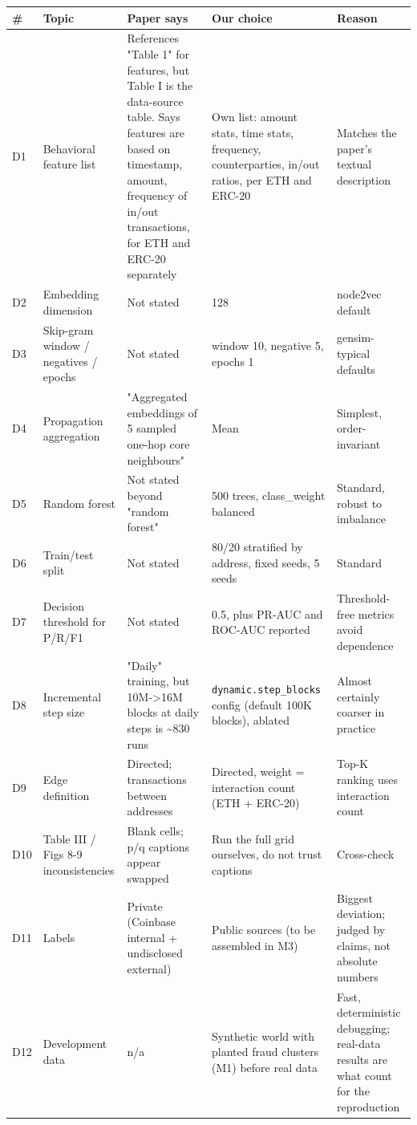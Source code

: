 \begin{longtable}{p{0.7cm} p{2.1cm} p{3.2cm} p{4.2cm} p{3.6cm}}
\toprule
\# & Topic & Paper says & Our choice & Reason\\
\midrule
\endhead
D1 & Behavioral feature list & References "Table 1" for features, but Table I is the data-source table. Says features are based on timestamp, amount, frequency of in/out transactions, for ETH and ERC-20 separately & Own list: amount stats, time stats, frequency, counterparties, in/out ratios, per ETH and ERC-20 & Matches the paper's textual description\\[2pt]
D2 & Embedding dimension & Not stated & 128 & node2vec default\\[2pt]
D3 & Skip-gram window / negatives / epochs & Not stated & window 10, negative 5, epochs 1 & gensim-typical defaults\\[2pt]
D4 & Propagation aggregation & "Aggregated embeddings of 5 sampled one-hop core neighbours" & Mean & Simplest, order-invariant\\[2pt]
D5 & Random forest & Not stated beyond "random forest" & 500 trees, class\_weight balanced & Standard, robust to imbalance\\[2pt]
D6 & Train/test split & Not stated & 80/20 stratified by address, fixed seeds, 5 seeds & Standard\\[2pt]
D7 & Decision threshold for P/R/F1 & Not stated & 0.5, plus PR-AUC and ROC-AUC reported & Threshold-free metrics avoid dependence\\[2pt]
D8 & Incremental step size & "Daily" training, but 10M->16M blocks at daily steps is \textasciitilde{}830 runs & \texttt{dynamic.step\_\allowbreak{}blocks} config (default 100K blocks), ablated & Almost certainly coarser in practice\\[2pt]
D9 & Edge definition & Directed; transactions between addresses & Directed, weight = interaction count (ETH + ERC-20) & Top-K ranking uses interaction count\\[2pt]
D10 & Table III / Figs 8-9 inconsistencies & Blank cells; p/q captions appear swapped & Run the full grid ourselves, do not trust captions & Cross-check\\[2pt]
D11 & Labels & Private (Coinbase internal + undisclosed external) & Public sources (to be assembled in M3) & Biggest deviation; judged by claims, not absolute numbers\\[2pt]
D12 & Development data & n/a & Synthetic world with planted fraud clusters (M1) before real data & Fast, deterministic debugging; real-data results are what count for the reproduction\\[2pt]

\end{longtable}
